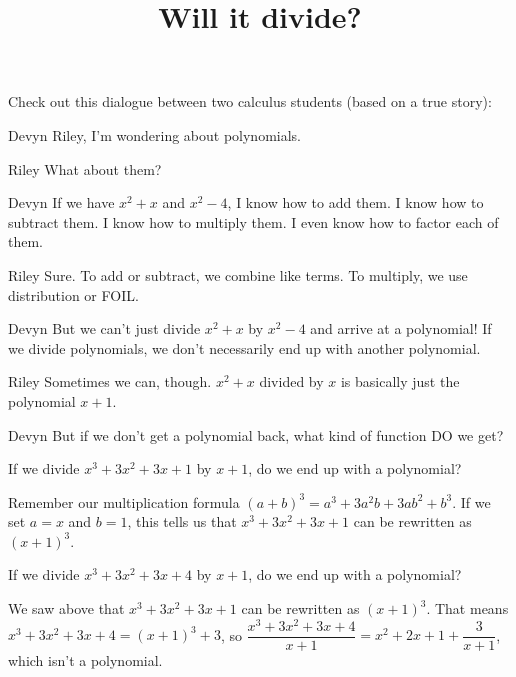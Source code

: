 \documentclass{ximera}
\title[Break-Ground:]{Will it divide?}
\begin{document}
\begin{abstract}
\end{abstract}
\maketitle

Check out this dialogue between two calculus students (based on a true
story):

\begin{dialogue}
\item[Devyn] Riley, I'm wondering about polynomials.
\item[Riley] What about them?
\item[Devyn] If we have $x^2+x$ and $x^2-4$, I know how to add them.  I know how to subtract them.  I know how to multiply them.  I even know how to factor each of them.
\item[Riley] Sure.  To add or subtract, we combine like terms.  To multiply, we use distribution or FOIL.
\item[Devyn] But we can't just divide $x^2+x$ by $x^2-4$ and arrive at a polynomial!  If we divide polynomials, we don't necessarily end up with another polynomial.
\item[Riley] Sometimes we can, though.  $x^2 + x$ divided by $x$ is basically just the polynomial $x+1$.
\item[Devyn] But if we don't get a polynomial back, what kind of function DO we get?
\end{dialogue}

\begin{problem}
	If we divide $x^3 + 3x^2 + 3x + 1$ by $x+1$, do we end up with a polynomial?
	\begin{multipleChoice}
	\end{multipleChoice}
	\begin{feedback}
		Remember our multiplication formula $(a+b)^3 = a^3 + 3 a^2 b + 3 a b^2 + b^3$.  If we set $a = x$ and $b = 1$, this tells us that
		$x^3 + 3x^2 + 3x + 1$ can be rewritten as $(x + 1)^3$.
	\end{feedback}
\end{problem}

\begin{problem}
	If we divide $x^3 + 3x^2 + 3x + 4$ by $x+1$, do we end up with a polynomial?
	\begin{multipleChoice}
		\choice{yes}
		\choice[correct]{no}
	\end{multipleChoice}
	\begin{feedback}
		We saw above that $x^3 + 3x^2 + 3x + 1$ can be rewritten as $(x + 1)^3$.  That means $x^3 + 3x^2 + 3x + 4 = (x+1)^3 + 3$,
		so $\displaystyle \dfrac{x^3 + 3x^2 + 3x + 4}{x+1} = x^2 + 2x + 1 + \dfrac{3}{x+1}$, which isn't a polynomial.
	\end{feedback}
\end{problem}





%
\end{document}
